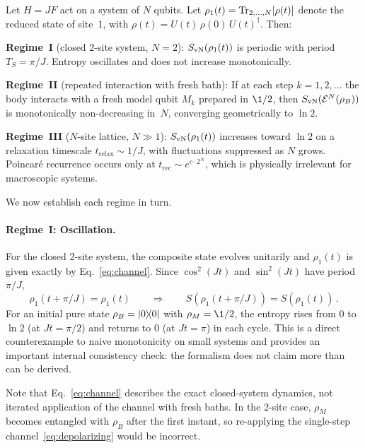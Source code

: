 \begin{proposition}
\label{prop:three-regimes}
Let $H = JF$ act on a system of $N$ qubits.  Let
$\rho_1(t) = \operatorname{Tr}_{2,\ldots,N}[\rho(t)]$ denote the reduced state
of site~$1$, with $\rho(t) = U(t)\,\rho(0)\,U(t)^\dagger$.
Then:\smallskip

\noindent\textbf{Regime~I} (closed 2-site system, $N = 2$):
$S_{\mathrm{vN}}(\rho_1(t))$ is periodic with period $T_S = \pi/J$.  Entropy
oscillates and does not increase monotonically.\smallskip

\noindent\textbf{Regime~II} (repeated interaction with fresh bath):
If at each step $k = 1, 2, \ldots$ the body interacts with a fresh
model qubit $M_k$ prepared in $\1/2$, then
$S_{\mathrm{vN}}(\mathcal{E}^N(\rho_B))$ is monotonically non-decreasing in~$N$,
converging geometrically to $\ln 2$.\smallskip

\noindent\textbf{Regime~III} ($N$-site lattice, $N \gg 1$):
$S_{\mathrm{vN}}(\rho_1(t))$ increases toward $\ln 2$ on a relaxation timescale
$t_{\mathrm{relax}} \sim 1/J$, with fluctuations suppressed as
$N$ grows.  Poincar\'e recurrence occurs only at
$t_{\mathrm{rec}} \sim e^{c\cdot 2^N}$, which is physically
irrelevant for macroscopic systems.
\end{proposition}

\noindent We now establish each regime in turn.

\paragraph{Regime~I: Oscillation.}
For the closed 2-site system, the composite state evolves unitarily
and $\rho_1(t)$ is given exactly by Eq.~\eqref{eq:channel}.  Since
$\cos^2(Jt)$ and $\sin^2(Jt)$ have period $\pi/J$,
\begin{equation}
  \rho_1(t + \pi/J) = \rho_1(t)
  \qquad\Longrightarrow\qquad
  S(\rho_1(t + \pi/J)) = S(\rho_1(t)) \,.
  \label{eq:periodicity}
\end{equation}
For an initial pure state $\rho_B = | 0 \rangle\!\langle 0 |$ with
$\rho_M = \1/2$, the entropy rises from $0$ to $\ln 2$ (at
$Jt = \pi/2$) and returns to $0$ (at $Jt = \pi$) in each cycle.
This is a direct counterexample to naive monotonicity on small
systems and provides an important internal consistency check: the
formalism does not claim more than can be derived.

Note that Eq.~\eqref{eq:channel} describes the exact closed-system
dynamics, not iterated application of the channel with fresh baths.
In the 2-site case, $\rho_M$ becomes entangled with $\rho_B$ after
the first instant, so re-applying the single-step
channel~\eqref{eq:depolarizing} would be incorrect.

